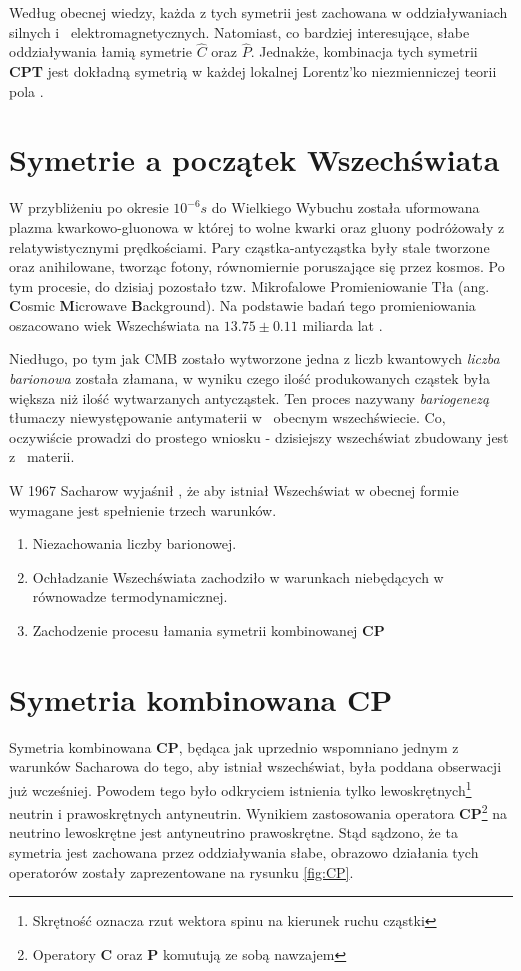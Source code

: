 Według obecnej wiedzy, każda z tych symetrii jest zachowana w oddziaływaniach silnych i~ elektromagnetycznych. Natomiast, co bardziej interesujące, słabe oddziaływania łamią symetrie \textbf{$\hat{C}$} oraz  \textbf{$\hat{P}$}. Jednakże, kombinacja tych symetrii \textbf{CPT} jest dokładną symetrią w każdej lokalnej Lorentz'ko niezmienniczej teorii pola \cite{symmetry}.

\section{Symetrie a początek Wszechświata}
W przybliżeniu po okresie $10^{-6}s$ do Wielkiego Wybuchu została uformowana plazma kwarkowo-gluonowa w której to wolne kwarki oraz gluony podróżowały z relatywistycznymi prędkościami. Pary cząstka-antycząstka były stale tworzone oraz anihilowane, tworząc fotony, równomiernie poruszające się przez kosmos. Po tym procesie, do dzisiaj pozostało tzw. Mikrofalowe Promieniowanie Tła (ang. \textbf{C}osmic \textbf{M}icrowave \textbf{B}ackground). Na podstawie badań tego promieniowania oszacowano wiek Wszechświata na $13.75 \pm 0.11$ miliarda lat \cite{CMB}.

Niedługo, po tym jak CMB zostało wytworzone jedna z liczb kwantowych \textit{liczba barionowa} została złamana, w wyniku czego ilość produkowanych cząstek była większa niż ilość wytwarzanych antycząstek. Ten proces nazywany \textit{bariogenezą} tłumaczy niewystępowanie antymaterii w~ obecnym wszechświecie. Co, oczywiście prowadzi do prostego wniosku - dzisiejszy wszechświat zbudowany jest z~ materii.

W 1967 Sacharow  wyjaśnił \cite{Sacharow}, że aby istniał Wszechświat w obecnej formie wymagane jest spełnienie trzech warunków. 
\begin{enumerate}
\item Niezachowania liczby barionowej. 
\item Ochładzanie Wszechświata zachodziło w warunkach niebędących w równowadze termodynamicznej. 
\item Zachodzenie procesu łamania symetrii kombinowanej \textbf{CP} 
\end{enumerate}

\section{Symetria kombinowana \textbf{CP}}
Symetria kombinowana \textbf{CP}, będąca jak uprzednio wspomniano jednym z warunków Sacharowa do tego, aby istniał wszechświat, była poddana obserwacji już wcześniej. Powodem tego było odkryciem istnienia tylko lewoskrętnych\footnote{Skrętność oznacza rzut wektora spinu na kierunek ruchu cząstki} neutrin i prawoskrętnych antyneutrin. Wynikiem zastosowania operatora \textbf{CP}\footnote{Operatory \textbf{C} oraz \textbf{P} komutują ze sobą nawzajem} na neutrino lewoskrętne jest antyneutrino prawoskrętne. Stąd sądzono, że ta symetria jest zachowana przez oddziaływania słabe, obrazowo działania tych operatorów zostały zaprezentowane na rysunku \ref{fig:CP}.



